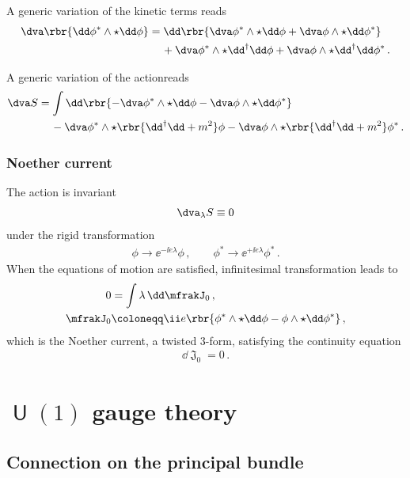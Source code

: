 \documentclass[a4paper]{article}
\begin{document}
A generic variation of the kinetic terms reads
\begin{align}
\begin{split}
\dva \rbr{\dd \phi^*\wedge\star\dd\phi} &= 
\dd\rbr{\dva\phi^*\wedge\star\dd\phi + \dva\phi\wedge\star\dd\phi^*}
\\
&\quad\,+
\dva\phi^*\wedge\star\dd^{\dagger}\dd\phi +
\dva\phi\wedge\star\dd^{\dagger}\dd\phi^*\,.
\end{split}
\end{align}

A generic variation of the actionreads
\begin{align}
\dva S &=
\int \dd\rbr{-\dva\phi^*\wedge\star\dd\phi -
\dva\phi\wedge\star\dd\phi^*}
\nonumber \\
&\quad\,-
\dva\phi^*\wedge\star\rbr{\dd^{\dagger}\dd+m^2}\phi -
\dva\phi\wedge\star\rbr{\dd^{\dagger}\dd+m^2}\phi^*\,.
\end{align}


\subsubsection{Noether current}
The action is invariant
\begin{align}
\dva_{\lambda} S \equiv 0
\end{align}
under the rigid transformation
\begin{align}
\phi \to \ee^{-\ii e \lambda} \phi\,,\qquad
\phi^* \to \ee^{+\ii e \lambda} \phi^*\,.
\end{align}
When the equations of motion are satisfied, infinitesimal 
transformation leads to
\begin{align}
0 &= \int \lambda\, \dd \mfrakJ_0\,,
\nonumber \\
\mfrakJ_0 &\coloneqq \ii e\rbr{\phi^*\wedge\star\dd\phi
	- \phi\wedge\star\dd\phi^*}\,,
\end{align}
which is the Noether current, a twisted $3$-form, satisfying the continuity 
equation
\begin{align}
\dd \mfrakJ_0 = 0\,.
\end{align}

\section[$U(1)$ gauge theory]{$\msansU(1)$ gauge theory}

\subsection{Connection on the principal bundle}
\end{document}
